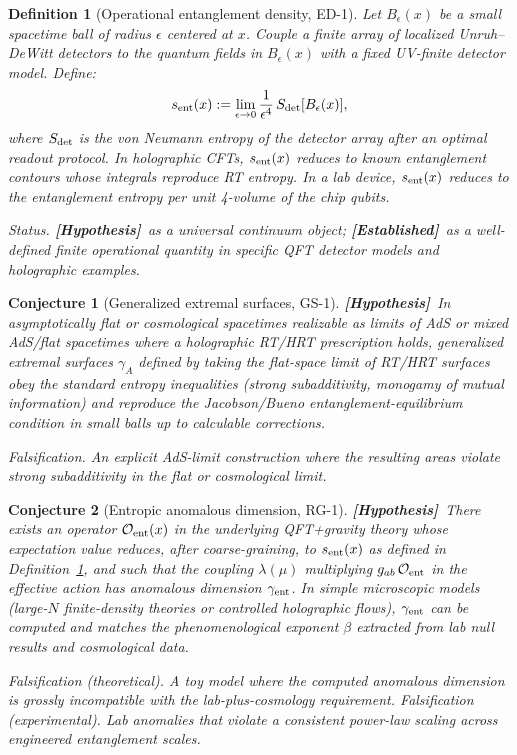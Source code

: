 \documentclass[12pt]{article}
\newtheorem{definition}{Definition}
\newtheorem{conjecture}{Conjecture}
\newcommand{\established}{\textbf{[Established]}}
\newcommand{\hypothesis}{\textbf{[Hypothesis]}}
\begin{document}
\begin{definition}[Operational entanglement density, ED-1]
\label{def:ED1}
Let $B_\epsilon(x)$ be a small spacetime ball of radius $\epsilon$ centered at $x$.
Couple a finite array of localized Unruh--DeWitt detectors to the quantum fields in
$B_\epsilon(x)$ with a fixed UV-finite detector model. Define:
\begin{equation}
s_{\rm ent}(x) := \lim_{\epsilon\to 0}\frac{1}{\epsilon^4}\,S_{\rm det}[B_\epsilon(x)],
\label{eq:sent_def}
\end{equation}
where $S_{\rm det}$ is the von Neumann entropy of the detector array after an optimal
readout protocol. In holographic CFTs, $s_{\rm ent}(x)$ reduces to known entanglement
contours whose integrals reproduce RT entropy. In a lab device, $s_{\rm ent}(x)$ reduces
to the entanglement entropy per unit 4-volume of the chip qubits.

\noindent\textit{Status.} \hypothesis\ as a universal continuum object;
\established\ as a well-defined finite operational quantity in specific QFT detector
models and holographic examples.
\end{definition}

\begin{conjecture}[Generalized extremal surfaces, GS-1]
\label{conj:GS1}
\hypothesis\ In asymptotically flat or cosmological spacetimes realizable as limits of
AdS or mixed AdS/flat spacetimes where a holographic RT/HRT prescription holds, generalized
extremal surfaces $\gamma_A$ defined by taking the flat-space limit of RT/HRT surfaces
obey the standard entropy inequalities (strong subadditivity, monogamy of mutual
information) and reproduce the Jacobson/Bueno entanglement-equilibrium condition in
small balls up to calculable corrections.

\noindent\textit{Falsification.} An explicit AdS-limit construction where the resulting
areas violate strong subadditivity in the flat or cosmological limit.
\end{conjecture}

\begin{conjecture}[Entropic anomalous dimension, RG-1]
\label{conj:RG1}
\hypothesis\ There exists an operator $\mathcal{O}_{\rm ent}(x)$ in the underlying
QFT+gravity theory whose expectation value reduces, after coarse-graining, to
$s_{\rm ent}(x)$ as defined in Definition~\ref{def:ED1}, and such that the coupling
$\lambda(\mu)$ multiplying $g_{ab}\,\mathcal{O}_{\rm ent}$ in the effective action has
anomalous dimension $\gamma_{\rm ent}$. In simple microscopic models (large-$N$
finite-density theories or controlled holographic flows), $\gamma_{\rm ent}$ can be
computed and matches the phenomenological exponent $\beta$ extracted from lab null
results and cosmological data.

\noindent\textit{Falsification (theoretical).} A toy model where the computed anomalous
dimension is grossly incompatible with the lab-plus-cosmology requirement.
\textit{Falsification (experimental).} Lab anomalies that violate a consistent
power-law scaling across engineered entanglement scales.
\end{conjecture}
\end{document}
